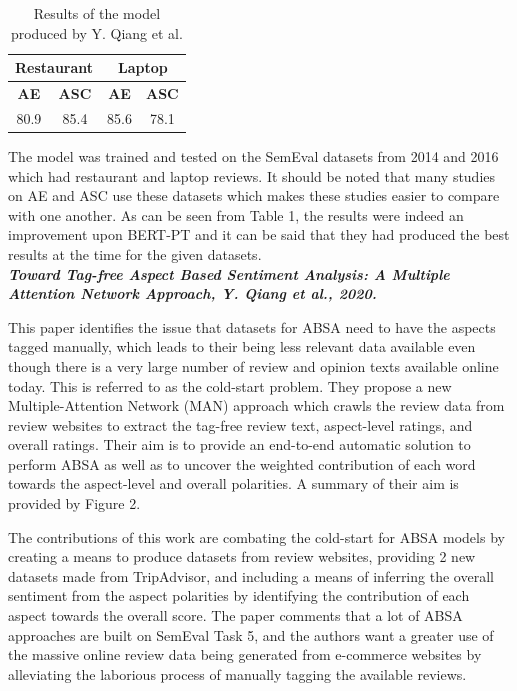\documentclass[conference]{IEEEtran}
\begin{document}
\begin{table}[htbp]
\caption{Results of the model produced by Y. Qiang et al.}
\begin{center}
\begin{tabular}{|c|c|c|c|}
\hline
\multicolumn{2}{|c|}{\textbf{Restaurant}} & \multicolumn{2}{|c|}{\textbf{Laptop}} \\
\hline
\textbf{AE} & \textbf{ASC} & \textbf{AE} & \textbf{ASC} \\
\hline
80.9 & 85.4 & 85.6 & 78.1 \\
\hline
\end{tabular}
\end{center}
\end{table}

The model was trained and tested on the SemEval datasets from 2014 and 2016 which had restaurant and laptop reviews. It should be noted that many studies on AE and ASC use these datasets which makes these studies easier to compare with one another. As can be seen from Table 1, the results were indeed an improvement upon BERT-PT and it can be said that they had produced the best results at the time for the given datasets.\\

\textit{\textbf{Toward Tag-free Aspect Based Sentiment Analysis:
A Multiple Attention Network Approach, Y. Qiang et al., 2020.}}

This paper identifies the issue that datasets for ABSA need to have the aspects tagged manually, which leads to their being less relevant data available even though there is a very large number of review and opinion texts available online today. This is referred to as the cold-start problem. They propose a new Multiple-Attention Network (MAN) approach which crawls the review data from review websites to extract the tag-free review text, aspect-level ratings, and overall ratings. Their aim is to provide an end-to-end automatic solution to perform ABSA as well as to uncover the weighted contribution of each word towards the aspect-level and overall polarities. A summary of their aim is provided by Figure 2.

The contributions of this work are combating the cold-start for ABSA models by creating a means to produce datasets from review websites, providing 2 new datasets made from TripAdvisor, and including a means of inferring the overall sentiment from the aspect polarities by identifying the contribution of each aspect towards the overall score. The paper comments that a lot of ABSA approaches are built on SemEval Task 5, and the authors want a greater use of the massive online review data being generated from e-commerce websites by alleviating the laborious process of manually tagging the available reviews.
\end{document}
